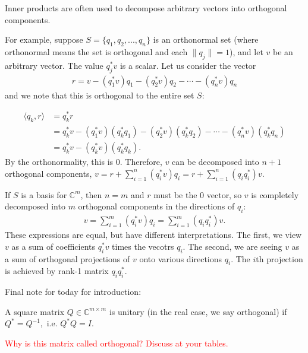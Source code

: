 \documentclass{ximera}
\begin{document}
Inner products are often used to decompose arbitrary vectors into orthogonal components.

For example, suppose $S = \{q_1, q_2, ..., q_n\}$ is an orthonormal set (where orthonormal means the set is orthogonal and each $\|q_j\| = 1$), and let $v$ be an arbitrary vector.  The value $q_j^*v$ is a scalar.  Let us consider the vector
\begin{align}
    r = v - (q_1^*v)q_1- (q_2^*v)q_2- \cdots - (q_n^*v)q_n
\end{align}
and we note that this is orthogonal to the entire set $S$:

\begin{align}
    \langle q_k,r \rangle &= q_k^*r \\
    &= q_k^*v - (q_1^*v)(q_k^*q_1)- (q_2^*v)(q_k^*q_2)- \cdots - (q_n^*v)(q_k^*q_n) \\
    &= q_k^*v - (q_k^*v)(q_k^*q_k).
\end{align}
By the orthonormality, this is $0$.  Therefore, $v$ can be decomposed into $n+1$ orthogonal components, $v = r + \sum\limits_{i=1}^n (q_i^*v)q_i = r + \sum\limits_{i=1}^n(q_iq_i^*)v$.

If $S$ is a basis for $\mathbb{C}^m$, then $n = m$ and $r$ must be the $0$ vector, so $v$ is completely decomposed into $m$ orthogonal components in the directions of $q_i$:
\begin{align}
    v = \sum\limits_{i=1}^m (q_i^*v)q_i = \sum\limits_{i=1}^m (q_iq_i^*)v.
\end{align}
These expressions are equal, but have different interpretations.  The first, we view $v$ as a sum of coefficients $q_i^*v$ times the vecotrs $q_i$.  The second, we are seeing $v$ as a sum of orthogonal projections of $v$ onto various directions $q_i$.  The $i$th projection is achieved by rank-1 matrix $q_iq_i^*$.

Final note for today for introduction:
\begin{definition}
A square matrix $Q \in \mathbb{C}^{m \times m}$  is unitary (in the real case, we say orthogonal) if $Q^* = Q^{-1},$ i.e. $Q^*Q = I$.
\end{definition}

\textcolor{red}{Why is this matrix called orthogonal?  Discuss at your tables.}
\end{document}
